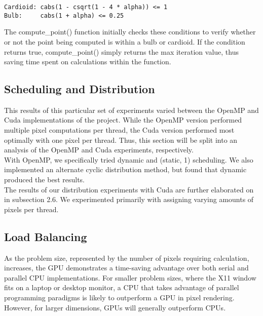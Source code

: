 \documentclass{article}
\begin{document}
\begin{verbatim}
Cardioid: cabs(1 - csqrt(1 - 4 * alpha)) <= 1
Bulb:     cabs(1 + alpha) <= 0.25
\end{verbatim}

The compute\_point() function initially checks these conditions to verify whether or not the point being computed is within a bulb or cardioid.
If the condition returns true, compute\_point() simply returns the max iteration value, thus saving time spent on calculations within the function.

\subsection{Scheduling and Distribution}

This results of this particular set of experiments varied between the OpenMP and Cuda implementations of the project.
While the OpenMP version performed multiple pixel computations per thread, the Cuda version performed most optimally with one pixel per thread.
Thus, this section will be split into an analysis of the OpenMP and Cuda experiments, respectively.\\

With OpenMP, we specifically tried dynamic and (static, 1) scheduling.
We also implemented an alternate cyclic distribution method, but found that dynamic produced the best results.\\

The results of our distribution experiments with Cuda are further elaborated on in subsection 2.6.
We experimented primarily with assigning varying amounts of pixels per thread.

\subsection{Load Balancing}

As the problem size, represented by the number of pixels requiring calculation, increases, the GPU demonstrates a time-saving advantage over both serial and parallel CPU implementations.
For smaller problem sizes, where the X11 window fits on a laptop or desktop monitor, a CPU that takes advantage of parallel programming paradigms is likely to outperform a GPU in pixel rendering.
However, for larger dimensions, GPUs will generally outperform CPUs.\\
\end{document}
